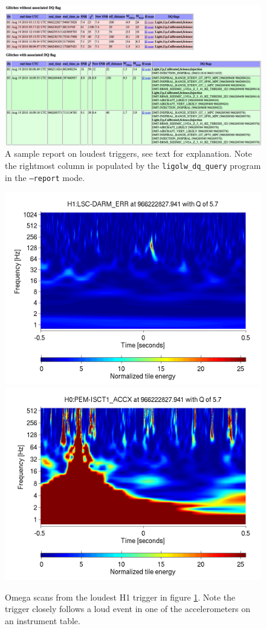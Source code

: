 \begin{figure}
  \includegraphics[width=\linewidth]{figures/detchar/loudest.png}
  \caption[Sample loudest trigger report from Aug 19, 2010]{
  \label{f:daily_ihope_loudest}
A sample report on loudest triggers, see text for explanation.  Note the
rightmost column is populated by
the \texttt{ligolw\_dq\_query} program in the \texttt{--report} mode.}
\end{figure}%



\begin{figure}
  \includegraphics[width=0.5\linewidth]{figures/detchar/966222827_940673828_H1_LSC-DARM_ERR_1_00_spectrogram_whitened.png}
  \includegraphics[width=0.5\linewidth]{figures/detchar/966222827_940673828_H0_PEM-ISCT1_ACCX_1_00_spectrogram_whitened.png}
  \caption[Omega scans from the loudest H1 trigger in figure \ref{f:daily_ihope_loudest}]{
  \label{f:daily_ihope_loudest_omega}
Omega scans from the loudest H1 trigger in figure
\ref{f:daily_ihope_loudest}.
Note the trigger closely follows a loud
event in one of the accelerometers on an instrument table.}
\end{figure}%


